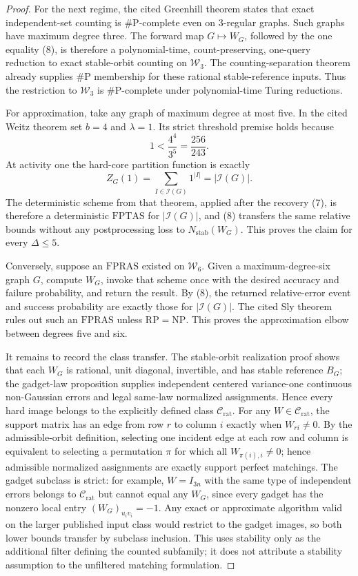 \documentclass{article}
\begin{document}
\begin{proof}
For the next regime, the cited Greenhill theorem states that exact independent-set counting is \(\#\mathrm P\)-complete even on \(3\)-regular graphs.  Such graphs have maximum degree three.  The forward map \(G\mapsto W_G\), followed by the one equality (8), is therefore a polynomial-time, count-preserving, one-query reduction to exact stable-orbit counting on \(\mathcal W_3\).  The counting-separation theorem already supplies \(\#\mathrm P\) membership for these rational stable-reference inputs.  Thus the restriction to \(\mathcal W_3\) is \(\#\mathrm P\)-complete under polynomial-time Turing reductions.

For approximation, take any graph of maximum degree at most five.  In the cited Weitz theorem set \(b=4\) and \(\lambda=1\).  Its strict threshold premise holds because
\[
 1<\frac{4^4}{3^5}=\frac{256}{243}. \tag{11}
\]
At activity one the hard-core partition function is exactly
\[
 Z_G(1)=\sum_{I\in\mathcal I(G)}1^{|I|}=|\mathcal I(G)|. \tag{12}
\]
The deterministic scheme from that theorem, applied after the recovery (7), is therefore a deterministic \(\mathrm{FPTAS}\) for \(|\mathcal I(G)|\), and (8) transfers the same relative bounds without any postprocessing loss to \(N_{\mathrm{stab}}(W_G)\).  This proves the claim for every \(\Delta\leq5\).

Conversely, suppose an \(\mathrm{FPRAS}\) existed on \(\mathcal W_6\).  Given a maximum-degree-six graph \(G\), compute \(W_G\), invoke that scheme once with the desired accuracy and failure probability, and return the result.  By (8), the returned relative-error event and success probability are exactly those for \(|\mathcal I(G)|\).  The cited Sly theorem rules out such an \(\mathrm{FPRAS}\) unless \(\mathrm{RP}=\mathrm{NP}\).  This proves the approximation elbow between degrees five and six.

It remains to record the class transfer.  The stable-orbit realization proof shows that each \(W_G\) is rational, unit diagonal, invertible, and has stable reference \(B_G\); the gadget-law proposition supplies independent centered variance-one continuous non-Gaussian errors and legal same-law normalized assignments.  Hence every hard image belongs to the explicitly defined class \(\mathcal C_{\mathrm{rat}}\).  For any \(W\in\mathcal C_{\mathrm{rat}}\), the support matrix has an edge from row \(r\) to column \(i\) exactly when \(W_{ri}\neq0\).  By the admissible-orbit definition, selecting one incident edge at each row and column is equivalent to selecting a permutation \(\pi\) for which all \(W_{\pi(i),i}\neq0\); hence admissible normalized assignments are exactly support perfect matchings.  The gadget subclass is strict: for example, \(W=I_{3n}\) with the same type of independent errors belongs to \(\mathcal C_{\mathrm{rat}}\) but cannot equal any \(W_G\), since every gadget has the nonzero local entry \((W_G)_{u_i v_i}=-1\).  Any exact or approximate algorithm valid on the larger published input class would restrict to the gadget images, so both lower bounds transfer by subclass inclusion.  This uses stability only as the additional filter defining the counted subfamily; it does not attribute a stability assumption to the unfiltered matching formulation.
\end{proof}
\end{document}
